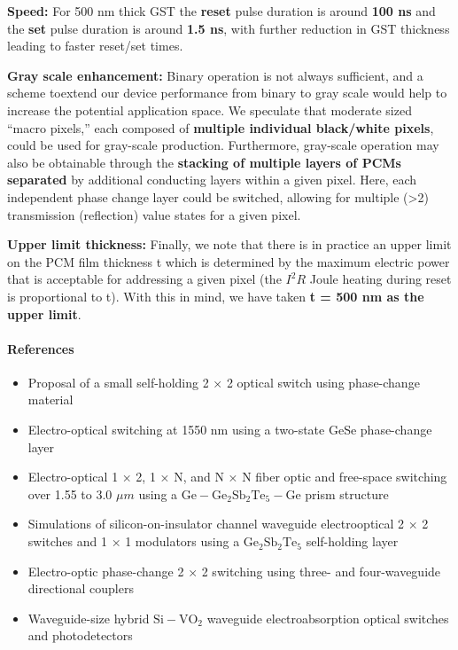 \documentclass[]{article}
\providecommand{\tightlist}{%
  \setlength{\itemsep}{0pt}\setlength{\parskip}{0pt}}
\let\oldparagraph\paragraph
\renewcommand{\paragraph}[1]{\oldparagraph{#1}\mbox{}}
\begin{document}
\textbf{Speed:} For 500 nm thick GST the \textbf{reset} pulse duration
is around \textbf{100 ns} and the \textbf{set} pulse duration is around
\textbf{1.5 ns}, with further reduction in GST thickness leading to
faster reset/set times.

\textbf{Gray scale enhancement:} Binary operation is not always
sufficient, and a scheme toextend our device performance from binary to
gray scale would help to increase the potential application space. We
speculate that moderate sized ``macro pixels,'' each composed of
\textbf{multiple individual black/white pixels}, could be used for
gray-scale production. Furthermore, gray-scale operation may also be
obtainable through the \textbf{stacking of multiple layers of PCMs
separated} by additional conducting layers within a given pixel. Here,
each independent phase change layer could be switched, allowing for
multiple (\textgreater{}2) transmission (reflection) value states for a
given pixel.

\textbf{Upper limit thickness:} Finally, we note that there is in
practice an upper limit on the PCM film thickness t which is determined
by the maximum electric power that is acceptable for addressing a given
pixel (the \(I^2 R\) Joule heating during reset is proportional to t).
With this in mind, we have taken \textbf{t = 500 nm as the upper limit}.

\paragraph{References}\label{references}

\begin{itemize}
\tightlist
\item
  Proposal of a small self-holding 2 × 2 optical switch using
  phase-change material
\item
  Electro-optical switching at 1550 nm using a two-state GeSe
  phase-change layer
\item
  Electro-optical 1 × 2, 1 × N, and N × N fiber optic and free-space
  switching over 1.55 to 3.0 \(\mu m\) using a
  \(\mathrm{Ge-Ge_2 Sb_2 Te_5 -Ge}\) prism structure
\item
  Simulations of silicon-on-insulator channel waveguide electrooptical 2
  × 2 switches and 1 × 1 modulators using a \(\mathrm{Ge_2 Sb_2 Te_5}\)
  self-holding layer
\item
  Electro-optic phase-change 2 × 2 switching using three- and
  four-waveguide directional couplers
\item
  Waveguide-size hybrid \(\mathrm{Si-VO_2}\) waveguide electroabsorption
  optical switches and photodetectors
\end{itemize}
\end{document}
